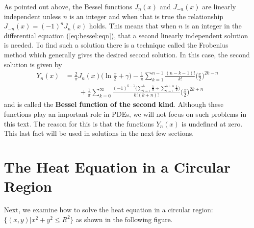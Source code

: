 As pointed out above, the Bessel functions $J_n(x)$ and $J_{-n}(x)$ are linearly independent unless $n$ is an integer and when that is true the relationship $J_{-n}(x)=(-1)^n J_n(x)$ holds.  This means that when $n$ is an integer in the differential equation (\ref{eq:bessel:eqn}), that a second linearly independent solution is needed.  To find such a solution there is a technique called the Frobenius method which generally gives the desired second solution.  In this case, the second solution is given by 
%
\begin{align*}
Y_n(x) & = \frac{2}{\pi} J_n(x) \biggl(\ln \frac{x}{2} + \gamma\biggr)- \frac{1}{\pi} \sum_{k=1}^{n-1} \frac{(n-k-1)!}{k!} \biggl(\frac{x}{2}\biggr)^{2k-n} \\
& \qquad + \frac{1}{\pi} \sum_{k=0}^{\infty} \frac{(-1)^{k-1} \bigl( \sum_{i=1}^k \frac{1}{k} + \sum_{i=1}^{k+n} \frac{1}{k} \bigr)}{k! (k+n)!} \biggl(\frac{x}{2}\biggr)^{2k+n} 
\end{align*}
and is called the \textbf{Bessel function of the second kind}.  Although these functions play an important role in PDEs, we will not focus on such problems in this text.  The reason for this is that the functions $Y_n(x)$ is undefined at zero.  This last fact will be used in solutions in the next few sections.  



\section{The Heat Equation in a Circular Region} \label{sect:heat:eqn:polar}

Next, we examine how to solve the heat equation in a circular region: $\{ (x,y) | x^2+y^2 \leq R^2 \}$ as shown in the following figure. 
%
\begin{center}
\end{center}


